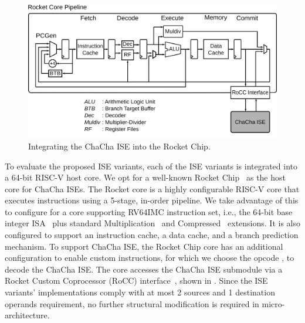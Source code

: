 \begin{figure}
	\centering
	\includegraphics[scale=0.7]{figures/RocketCoreRoCC.png}
	\caption{Integrating the ChaCha ISE into the Rocket Chip.}
	\label{fig:ise:RocketCoreRoCC} 
\end{figure} 

To evaluate the proposed ISE variants, each of the ISE variants is integrated into a 64-bit RISC-V host core. 
We opt for a well-known Rocket Chip~\cite{rocket:16} as the host core for ChaCha ISEs. 
The Rocket core is a highly configurable RISC-V core that executes instructions using a 5-stage, in-order pipeline. 
We take advantage of this to configure for a core supporting RV64IMC instruction set, i.e., the 64-bit base integer ISA~\cite[Chapter 5]{RV:ISA:I} plus standard Multiplication~\cite[Chapter 7]{RV:ISA:I} and Compressed~\cite[Chapter 16]{RV:ISA:I} extensions. It is also configured to support an instruction cache, a data cache, and a branch prediction mechanism.
To support ChaCha ISE, the Rocket Chip core has an additional configuration to enable custom instructions, for which we choose the  opcode \cite[Chapter 25]{RV:ISA:I}, to decode the ChaCha ISE.
The core accesses the ChaCha ISE submodule via a Rocket Custom Coprocessor (RoCC) interface~\cite[Section 4]{rocket:16}, shown in . Since the ISE variants' implementations 
comply with at most 2 sources and 1 destination operands requirement, no further structural modification is required in micro-architecture. 

